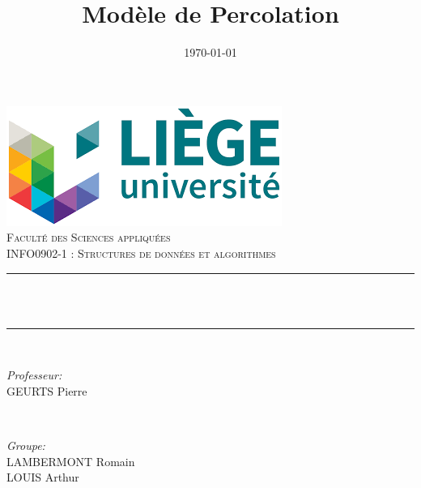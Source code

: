 \documentclass[12pt]{article}
\title{Modèle de Percolation}							%
\date{\today}											%
\makeatletter
\let\thetitle\@title
\let\thedate\@date
\makeatother
\begin{document}

\begin{titlepage}
	\centering
    \includegraphics[scale = 0.7]{University.png}\\[1.0 cm]	%
    \textsc{\LARGE \newline\newline Faculté des Sciences appliquées}\\	%
	\textsc{\Large  INFO0902-1 : Structures de données et algorithmes}\\[0.5 cm]				%
	\rule{\linewidth}{0.2 mm} \\[0.4 cm]
	{ \huge \bfseries \thetitle}\\
	\rule{\linewidth}{0.2 mm} \\[2 cm]
	
	\begin{minipage}{0.5\textwidth}
		\begin{flushleft} \large
			\emph{Professeur:}\\
			GEURTS Pierre\\
			\end{flushleft}
			\end{minipage}~
			\begin{minipage}{0.4\textwidth}
            
			\begin{flushright} \large
			\emph{Groupe:} \\
			LAMBERMONT Romain\\
            LOUIS Arthur\\
		\end{flushright}
        
	\end{minipage}\\[5 cm]
	
	
    \thedate
	
\end{titlepage}

\thispagestyle{empty}
\tableofcontents
\listoffigures
\pagebreak
\setcounter{page}{1}
\end{document}
